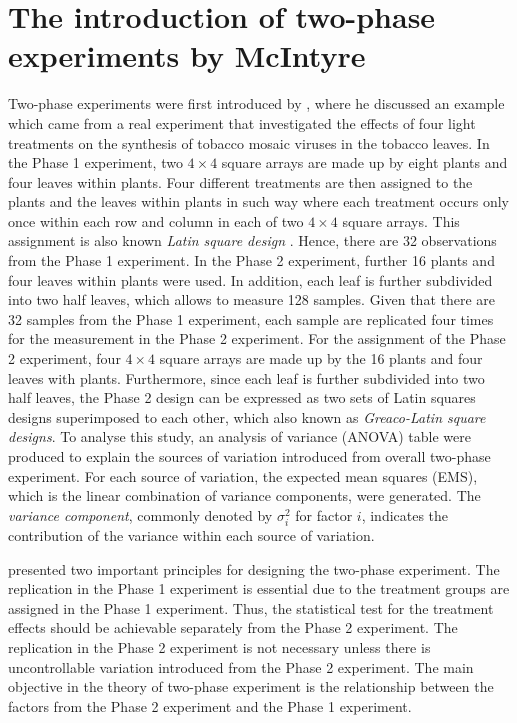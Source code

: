 \documentclass[11pt,a4paper]{article}
\begin{document}
\section{The introduction of two-phase experiments by McIntyre}
Two-phase experiments were first introduced by \cite{McIntyre1955}, where he discussed an example which came from a real experiment that investigated the effects of four light treatments on the synthesis of tobacco mosaic viruses in the tobacco leaves. In the Phase 1 experiment, two $4 \times 4$ square arrays are made up by eight plants and four leaves within plants. Four different treatments are then assigned to the plants and the leaves within plants in such way where each treatment occurs only once within each row and column in each of two $4 \times 4$ square arrays. This assignment is also known \emph{Latin square design} \citep{Bailey2008}. Hence, there are 32 observations from the Phase 1 experiment. In the Phase 2 experiment, further 16 plants and four leaves within plants were used. In addition, each leaf is further subdivided into two half leaves, which allows to measure 128 samples. Given that there are 32 samples from the Phase 1 experiment, each sample are replicated four times for the measurement in the Phase 2 experiment. For the assignment of the Phase 2 experiment, four $4 \times 4$ square arrays are made up by the 16 plants and four leaves with plants. Furthermore, since each leaf is further subdivided into two half leaves, the Phase 2 design can be expressed as two sets of Latin squares designs superimposed to each other, which also known as  \emph{Greaco-Latin square designs}. To analyse this study, an analysis of variance (ANOVA) table were produced to explain the sources of variation introduced from overall two-phase experiment. For each source of variation, the expected mean squares (EMS), which is the linear combination of variance components, were generated. The \emph{variance component}, commonly denoted by $\sigma_{i}^2$ for factor $i$, indicates the contribution of the variance within each source of variation.  

\citeauthor{McIntyre1955} presented two important principles for designing the two-phase experiment. The replication in the Phase 1 experiment is essential due to the treatment groups are assigned in the Phase 1 experiment. Thus, the statistical test for the treatment effects should be achievable separately from the Phase 2 experiment. The replication in the Phase 2 experiment is not necessary unless there is uncontrollable variation introduced from the Phase 2 experiment. The main objective in the theory of two-phase experiment is the relationship between the factors from the Phase 2 experiment and the Phase 1 experiment. 
\end{document}
